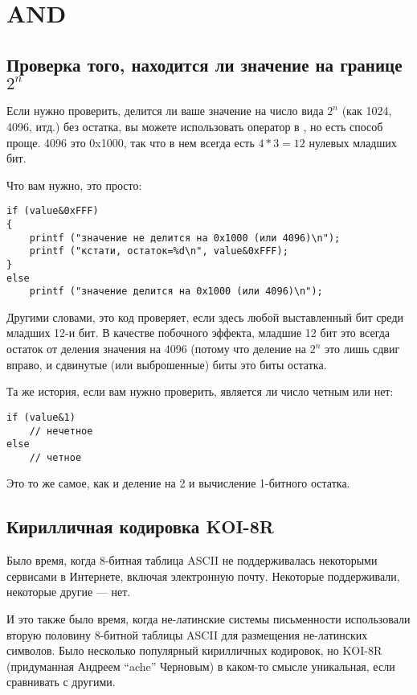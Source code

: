 \section{AND}

\subsection{Проверка того, находится ли значение на границе $2^n$}

Если нужно проверить, делится ли ваше значение на число вида 
$2^n$ (как 1024, 4096, итд.) без остатка,
вы можете использовать оператор \TT{\%} в \CCpp, но есть способ проще.
4096 это 0x1000, так что в нем всегда есть $4*3=12$ нулевых младших бит.

Что вам нужно, это просто:

\begin{lstlisting}[style=customc]
if (value&0xFFF)
{
	printf ("значение не делится на 0x1000 (или 4096)\n");
	printf ("кстати, остаток=%d\n", value&0xFFF);
}
else
	printf ("значение делится на 0x1000 (или 4096)\n");
\end{lstlisting}

Другими словами, это код проверяет, если здесь любой выставленный бит среди младших 12-и бит.
В качестве побочного эффекта, младшие 12 бит это всегда остаток от деления значения на 4096 (потому что деление на $2^n$
это лишь сдвиг вправо, и сдвинутые (или выброшенные) биты это биты остатка.

Та же история, если вам нужно проверить, является ли число четным или нет:

\begin{lstlisting}[style=customc]
if (value&1)
	// нечетное
else
	// четное
\end{lstlisting}

Это то же самое, как и деление на 2 и вычисление 1-битного остатка.

\subsection{Кирилличная кодировка KOI-8R}

Было время, когда 8-битная таблица \ac{ASCII} не поддерживалась некоторыми сервисами в Интернете, включая электронную почту.
Некоторые поддерживали, некоторые другие --- нет.

И это также было время, когда не-латинские системы письменности использовали вторую половину 8-битной таблицы ASCII
для размещения не-латинских символов.
Было несколько популярный кирилличных кодировок, но KOI-8R (придуманная Андреем ``ache'' Черновым)
в каком-то смысле уникальная, если сравнивать с другими.

